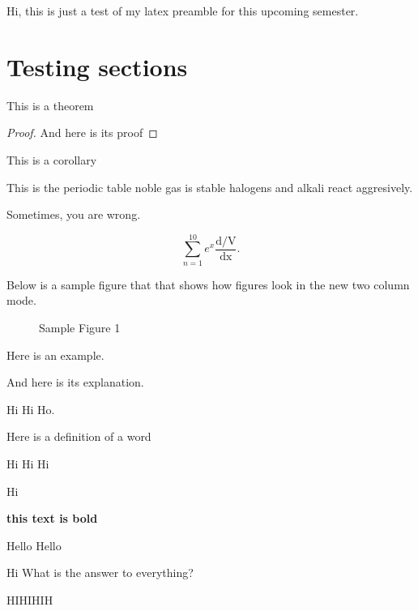 
Hi, this is just a test of my latex preamble for this upcoming semester.

\section{Testing sections}

\begin{theorem}
	This is a theorem
\end{theorem}
\begin{proof}
	And here is its proof
\end{proof}

\begin{corollary}
	This is a corollary
\end{corollary}

This is the periodic table noble gas is stable halogens and alkali react aggresively.

Sometimes, you are wrong.

\[
	\sum_{n=1}^{10} e^x \frac{\mathrm{d/V}}{\mathrm{dx}}
.\] 

Below is a sample figure that that shows how figures look in the new two column mode.

\begin{figure}[ht]
    \centering
    \caption{Sample Figure 1}
    \label{fig:sample-figure-1}
\end{figure}

\begin{eg}
	Here is an example.
\end{eg}
\begin{explanation}
	And here is its explanation.
\end{explanation}

Hi Hi Ho.

\begin{definition}
	Here is a definition of a word
\end{definition}

\begin{property}
	Hi Hi Hi
\end{property}
Hi

\textbf{this text is bold}

Hello Hello 

Hi
What is the answer to everything?

HIHIHIH
